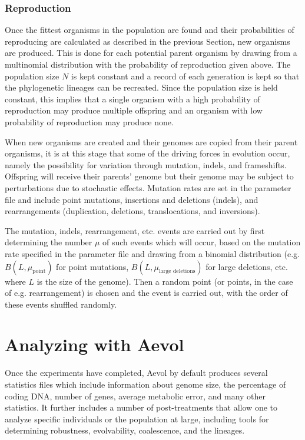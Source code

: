 \subsubsection{Reproduction}\label{subsec:aevol_reproduction}
Once the fittest organisms in the population are found and their probabilities of reproducing are calculated as described in the previous Section, new organisms are produced. This is done for each potential parent organism by drawing from a multinomial distribution with the probability of reproduction given above. The population size $N$ is kept constant and a record of each generation is kept so that the phylogenetic lineages can be recreated. Since the population size is held constant, this implies that a single organism with a high probability of reproduction may produce multiple offspring and an organism with low probability of reproduction may produce none.

When new organisms are created and their genomes are copied from their parent organisms, it is at this stage that some of the driving forces in evolution occur, namely the possibility for variation through mutation, indels, and frameshifts. Offspring will receive their parents' genome but their genome may be subject to perturbations due to stochastic effects. Mutation rates are set in the parameter file and include point mutations, insertions and deletions (indels), and rearrangements (duplication, deletions, translocations, and inversions).

The mutation, indels, rearrangement, etc. events are carried out by first determining the number $\mu$ of such events which will occur, based on the mutation rate specified in the parameter file and drawing from a binomial distribution (e.g. $B(L, \mu_\text{point})$ for point mutations, $B(L, \mu_\text{large deletions})$ for large deletions, etc. where $L$ is the size of the genome). Then a random point (or points, in the case of e.g. rearrangement) is chosen and the event is carried out, with the order of these events shuffled randomly. 

\section{Analyzing with Aevol}\label{sec:aevol_analysis}

Once the experiments have completed, Aevol by default produces several statistics files which include information about genome size, the percentage of coding DNA, number of genes, average metabolic error, and many other statistics. It further includes a number of post-treatments that allow one to analyze specific individuals or the population at large, including tools for determining robustness, evolvability, coalescence, and the lineages. 

